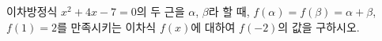 이차방정식 $x^2+4x-7=0$의 두 근을 $\alpha$, $\beta$라 할 때, $f(\alpha)=f(\beta)=\alpha+\beta$, $f(1)=2$를 만족시키는 이차식 $f(x)$에 대하여 $f(-2)$의 값을 구하시오.
